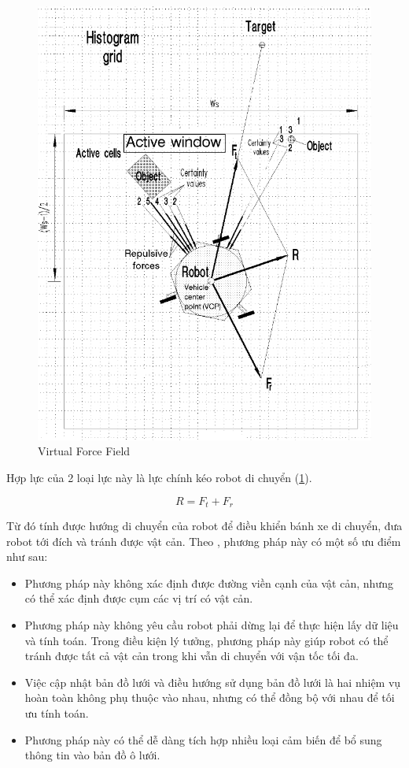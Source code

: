 \begin{figure}[htp]
  \centering
  \includegraphics[width=1\linewidth]{figures/VFFconcept.png}
  \caption{Virtual Force Field \cite{Koren1991}}
  \label{fig:VFFconcept}
\end{figure}

Hợp lực của 2 loại lực này là lực chính kéo robot di chuyển (\figurename{\ref{fig:VFFconcept}}).

\begin{equation}
  R = {F}_{t} + {F}_{r}
\end{equation}


Từ đó tính được hướng di chuyển của robot để điều khiển bánh xe di chuyển, đưa robot tới đích và tránh được vật cản. Theo \cite{Borenstein1988}, phương pháp này có một số ưu điểm như sau:
\begin{itemize}
  \item Phương pháp này không xác định được đường viền cạnh của vật cản, nhưng có thể xác định được cụm các vị trí có vật cản.
  \item Phương pháp này không yêu cầu robot phải dừng lại để thực hiện lấy dữ liệu và tính toán. Trong điều kiện lý tưởng, phương pháp này giúp robot có thể tránh được tất cả vật cản trong khi vẫn di chuyển với vận tốc tối đa.
  \item Việc cập nhật bản đồ lưới và điều hướng sử dụng bản đồ lưới là hai nhiệm vụ hoàn toàn không phụ thuộc vào nhau, nhưng có thể đồng bộ với nhau để tối ưu tính toán.
  \item Phương pháp này có thể dễ dàng tích hợp nhiều loại cảm biến để bổ sung thông tin vào bản đồ ô lưới.
\end{itemize}

